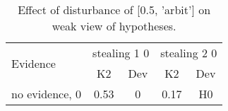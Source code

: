 \begin{table}\begin{tabular}{l|cc|cc}\toprule\multirow{2}{*}{Evidence} & \multicolumn{2}{c}{stealing 1 0}& \multicolumn{2}{c}{stealing 2 0}\\& {K2} & {Dev}& {K2} & {Dev}\\\midrule
no evidence, 0 & \cellcolor{Bittersweet}0.53&\cellcolor{Bittersweet}0&\cellcolor{Bittersweet}0.17&\cellcolor{Bittersweet}H0\\\bottomrule\end{tabular}\caption{Effect of disturbance of [0.5, 'arbit'] on weak view of hypotheses.}\end{table}
